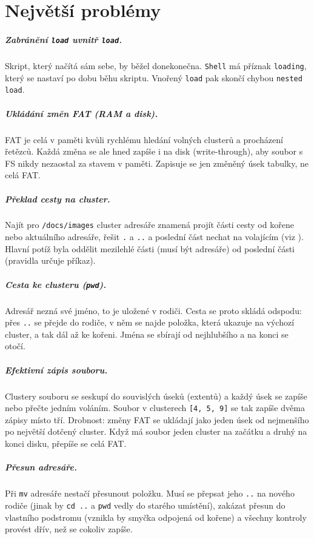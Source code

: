 \documentclass[10pt, a4paper]{report}
\newcommand{\code}[1]{\texttt{#1}}
\begin{document}
	\chapter{Největší problémy}
	
	\paragraph{Zabránění \code{load} uvnitř \code{load}.} Skript, který načítá sám sebe, by běžel
	donekonečna. \code{Shell} má příznak \code{loading}, který se nastaví po dobu běhu skriptu.
	Vnořený \code{load} pak skončí chybou \code{nested load}.
	
	\paragraph{Ukládání změn FAT (RAM a disk).} FAT je celá v paměti kvůli rychlému hledání
	volných clusterů a procházení řetězců. Každá změna se ale hned zapíše i na disk
	(write-through), aby soubor s FS nikdy nezaostal za stavem v paměti. Zapisuje se jen změněný
	úsek tabulky, ne celá FAT.
	
	\paragraph{Překlad cesty na cluster.} Najít pro \code{/docs/images} cluster adresáře znamená
	projít části cesty od kořene nebo aktuálního adresáře, řešit \code{.} a \code{..} a poslední část
	nechat na volajícím (viz ). Hlavní potíž byla oddělit mezilehlé části (musí
	být adresáře) od poslední části (pravidla určuje příkaz).
	
	\paragraph{Cesta ke clusteru (\code{pwd}).} Adresář nezná své jméno, to je uložené v rodiči.
	Cesta se proto skládá odspodu: přes \code{..} se přejde do rodiče, v něm se najde položka, která
	ukazuje na výchozí cluster, a tak dál až ke kořeni. Jména se sbírají od nejhlubšího a na konci se
	otočí.
	
	\paragraph{Efektivní zápis souboru.} Clustery souboru se seskupí do souvislých úseků (extentů) a
	každý úsek se zapíše nebo přečte jedním voláním. Soubor v clusterech \code{[4, 5, 9]} se tak
	zapíše dvěma zápisy místo tří. Drobnost: změny FAT se ukládají jako jeden úsek od nejmenšího po
	největší dotčený cluster. Když má soubor jeden cluster na začátku a druhý na konci disku,
	přepíše se celá FAT.
	
	\paragraph{Přesun adresáře.} Při \code{mv} adresáře nestačí přesunout položku. Musí se přepsat
	jeho \code{..} na nového rodiče (jinak by \code{cd ..} a \code{pwd} vedly do starého
	umístění), zakázat přesun do vlastního podstromu (vznikla by smyčka odpojená od kořene) a
	všechny kontroly provést dřív, než se cokoliv zapíše.
	
\end{document}
